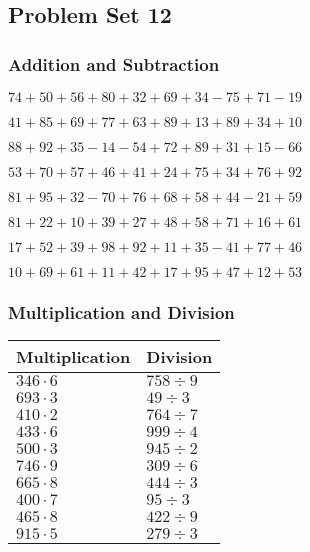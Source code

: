 \hypertarget{problem-set-12}{%
\subsection{Problem Set 12}\label{problem-set-12}}

\hypertarget{addition-and-subtraction}{%
\subsubsection{Addition and
Subtraction}\label{addition-and-subtraction}}

\(74+50+56+80+32+69+34-75+71-19\)

\(41+85+69+77+63+89+13+89+34+10\)

\(88+92+35-14-54+72+89+31+15-66\)

\(53+70+57+46+41+24+75+34+76+92\)

\(81+95+32-70+76+68+58+44-21+59\)

\(81+22+10+39+27+48+58+71+16+61\)

\(17+52+39+98+92+11+35-41+77+46\)

\(10+69+61+11+42+17+95+47+12+53\)

\hypertarget{multiplication-and-division}{%
\subsubsection{Multiplication and
Division}\label{multiplication-and-division}}

\begin{longtable}[]{@{}ll@{}}
\toprule
Multiplication & Division\tabularnewline
\midrule
\endhead
\(346\cdot6\) & \(758÷9\)\tabularnewline
\(693\cdot3\) & \(49÷3\)\tabularnewline
\(410\cdot2\) & \(764÷7\)\tabularnewline
\(433\cdot6\) & \(999÷4\)\tabularnewline
\(500\cdot3\) & \(945÷2\)\tabularnewline
\(746\cdot9\) & \(309÷6\)\tabularnewline
\(665\cdot8\) & \(444÷3\)\tabularnewline
\(400\cdot7\) & \(95÷3\)\tabularnewline
\(465\cdot8\) & \(422÷9\)\tabularnewline
\(915\cdot5\) & \(279÷3\)\tabularnewline
\bottomrule
\end{longtable}
